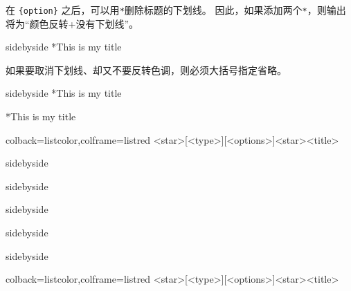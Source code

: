 \documentclass[fontset=none]{ctexart}
\begin{document}
	
	在 \verb|{option}| 之后，可以用\verb|*|删除标题的下划线。 因此，如果添加两个\verb|*|，则输出将为“颜色反转+没有下划线”。
	\begin{dispExample*}{sidebyside}
		\ascboxB**{This is my title} 
	\end{dispExample*}
	
	如果要取消下划线、却又不要反转色调，则必须大括号指定省略。
	\begin{dispExample*}{sidebyside}
		\ascboxB[A][]*{This is my title}
		
		\ascboxB*[C][]*{This is my title}
	\end{dispExample*}
	
	
	
	\begin{dispListing*}{colback=listcolor,colframe=listred}
		[<type>][<options>]<star>{<title>}
	\end{dispListing*}
	
	
	\begin{dispExample*}{sidebyside}
		
	\end{dispExample*}
	
	
	
	\begin{dispExample*}{sidebyside}
		
	\end{dispExample*}
	
	
	
	\begin{dispExample*}{sidebyside}
		
	\end{dispExample*}
	
	
	
	\begin{dispExample*}{sidebyside}
		
	\end{dispExample*}
	
	
	\begin{dispExample*}{sidebyside}
		
	\end{dispExample*}
	
	
	
	
	\begin{dispListing*}{colback=listcolor,colframe=listred}
		[<type>][<options>]<star>{<title>}
	\end{dispListing*}
	
\end{document}
